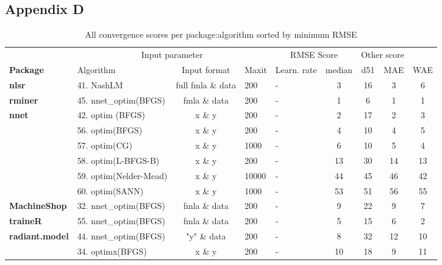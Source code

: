 \hypertarget{appendix-d}{%
\subsection{Appendix D}\label{appendix-d}}

\begin{Schunk}
\begin{table}

\caption{\label{tab:unnamed-chunk-9}All convergence scores per package:algorithm sorted by minimum RMSE}
\centering
\fontsize{7}{9}\selectfont
\begin{tabular}[t]{>{\bfseries}llcllcccc}
\toprule
\multicolumn{2}{c}{ } & \multicolumn{3}{c}{Input parameter} & \multicolumn{2}{c}{RMSE Score} & \multicolumn{2}{c}{Other score} \\
\cmidrule(l{3pt}r{3pt}){3-5} \cmidrule(l{3pt}r{3pt}){6-7} \cmidrule(l{3pt}r{3pt}){8-9}
Package & Algorithm & Input format & Maxit & Learn. rate & median & d51 & MAE & WAE\\
\midrule
nlsr & 41. NashLM & full fmla \& data & 200 & - & 3 & 16 & 3 & 6\\
\cmidrule{1-9}
rminer & 45. nnet\_optim(BFGS) & fmla \& data & 200 & - & 1 & 6 & 1 & 1\\
\cmidrule{1-9}
nnet & 42. optim (BFGS) & x \& y & 200 & - & 2 & 17 & 2 & 3\\
\cmidrule{1-9}
 & 56. optim(BFGS) & x \& y & 200 & - & 4 & 10 & 4 & 5\\

 & 57. optim(CG) & x \& y & 1000 & - & 6 & 10 & 5 & 4\\

 & 58. optim(L-BFGS-B) & x \& y & 200 & - & 13 & 30 & 14 & 13\\

 & 59. optim(Nelder-Mead) & x \& y & 10000 & - & 44 & 45 & 46 & 42\\

\multirow{-5}{*}{\raggedright\arraybackslash validann} & 60. optim(SANN) & x \& y & 1000 & - & 53 & 51 & 56 & 55\\
\cmidrule{1-9}
MachineShop & 32. nnet\_optim(BFGS) & fmla \& data & 200 & - & 9 & 22 & 9 & 7\\
\cmidrule{1-9}
traineR & 55. nnet\_optim(BFGS) & fmla \& data & 200 & - & 5 & 15 & 6 & 2\\
\cmidrule{1-9}
radiant.model & 44. nnet\_optim(BFGS) & "y" \& data & 200 & - & 8 & 32 & 12 & 10\\
\cmidrule{1-9}
 & 34. optimx(BFGS) & x \& y & 200 & - & 10 & 18 & 9 & 11\\


\end{tabular}
\end{table}
\end{Schunk}
